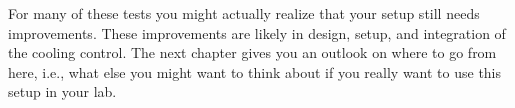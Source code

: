 For many of these tests you might actually realize that your setup still needs improvements. These improvements are likely in design, setup, and integration of the cooling control. The next chapter gives you an outlook on where to go from here, i.e., what else you might want to think about if you really want to use this setup in your lab.